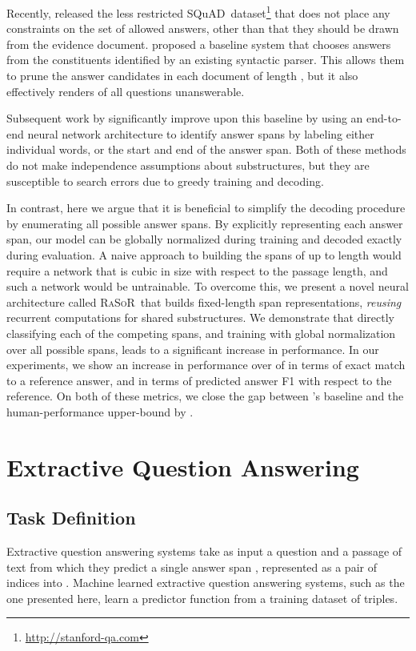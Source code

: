 \documentclass{article} \usepackage{iclr2017_conference,times}
\newcommand{\squad}{{\sc SQuAD}}
\newcommand{\ourmodel}{\textsc{RaSoR}}
\begin{document}
Recently, \cite{rajpurkar:2016} released the less restricted \squad~dataset\footnote{\url{http://stanford-qa.com}} that does not place any constraints on the set of allowed answers, other than that they should be drawn from the evidence document.
\citeauthor{rajpurkar:2016} proposed a baseline system that chooses answers from the constituents identified by an existing syntactic parser.
This allows them to prune the  answer candidates in each document of length , but it also effectively renders  of all questions unanswerable.

Subsequent work by \cite{wang2016machine} significantly improve upon this baseline by using an end-to-end neural network architecture to identify answer spans by labeling either individual words, or the start and end of the answer span.
Both of these methods do not make independence assumptions about substructures, but they are susceptible to search errors due to greedy training and decoding.

In contrast, here we argue that it is beneficial to simplify the decoding procedure by enumerating all possible answer spans. 
By explicitly representing each answer span, our model can be globally normalized during training and decoded exactly during evaluation.
A naive approach to building the  spans of up to length  would require a network that is cubic in size with respect to the passage length, and such a network would be untrainable.
To overcome this, we present a novel neural architecture called \ourmodel~that builds fixed-length span representations, \textit{reusing} recurrent computations for shared substructures.  We demonstrate that directly classifying each of the competing spans, and training with global normalization over all possible spans, leads to a significant increase in performance.
In our experiments, we show an increase in performance over \cite{wang2016machine} of  in terms of exact match to a reference answer, and   in terms of predicted answer F1 with respect to the reference. On both of these metrics, we close the gap between \citeauthor{rajpurkar:2016}'s baseline and the human-performance upper-bound by . \section{Extractive Question Answering}
\subsection{Task Definition}
Extractive question answering systems take as input a question  and a passage of text  from which they predict a single answer span , represented as a pair of indices into .
Machine learned extractive question answering systems, such as the one presented here, learn a predictor function  from a training dataset of  triples.
\end{document}
